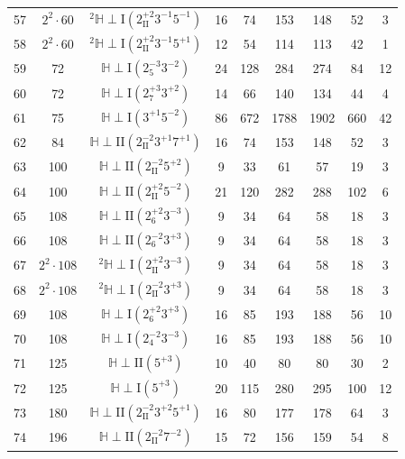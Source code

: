 \documentclass{amsart}
\theoremstyle{definition}
\theoremstyle{remark}
\begin{document}
\begin{center}
\begin{longtable}{c|c|c|c|c|c|c|c|c}
  57 &  $2^2 \cdot 60$ & ${}^{2}\!{\mathbb{H}} \perp \mathrm{I}(2_{\mathrm{II}}^{+2}3^{-1}5^{-1})$   & 16 & 74 & 153 & 148 & 52 & 3 \\
  58 &  $2^2 \cdot 60$ & ${}^{2}\!{\mathbb{H}} \perp \mathrm{I}(2_{\mathrm{II}}^{+2}3^{-1}5^{+1})$   & 12 & 54 & 114 & 113 & 42 & 1 \\
  59 &  72 & $\mathbb{H} \perp \mathrm{I}(2_{5}^{-3}3^{-2})$   & 24 & 128 & 284 & 274 & 84 & 12 \\
  60 &   72 & $\mathbb{H} \perp \mathrm{I}(2_{7}^{+3}3^{+2})$   & 14 & 66 & 140 & 134 & 44 & 4 \\
  61 &  75 & $\mathbb{H} \perp \mathrm{I}(3^{+1}5^{-2})$   & 86 & 672 & 1788 & 1902 & 660 & 42 \\
  62 &  84 & $\mathbb{H} \perp \mathrm{II}(2_{\mathrm{II}}^{-2}3^{+1}7^{+1})$   & 16 & 74 & 153 & 148 & 52 & 3 \\
  63 &  100 & $\mathbb{H} \perp \mathrm{II}(2_{\mathrm{II}}^{-2}5^{+2})$   & 9 & 33 & 61 & 57 & 19 & 3 \\
  64 &  100 & $\mathbb{H} \perp \mathrm{II}(2_{\mathrm{II}}^{+2}5^{-2})$   & 21 & 120 & 282 & 288 & 102 & 6 \\
  65 & 108 & $\mathbb{H} \perp \mathrm{II}(2_{6}^{+2}3^{-3})$   & 9 & 34 & 64 & 58 & 18 & 3 \\
  66 &108 & $\mathbb{H} \perp \mathrm{II}(2_{6}^{-2}3^{+3})$   & 9 & 34 & 64 & 58 & 18 & 3 \\
  67 & $2^2 \cdot 108$ & ${}^{2}\!{\mathbb{H}} \perp \mathrm{I}(2_{\mathrm{II}}^{+2}3^{-3})$   & 9 & 34 & 64 & 58 & 18 & 3 \\
  68 & $2^2 \cdot 108$ & ${}^{2}\!{\mathbb{H}} \perp \mathrm{I}(2_{\mathrm{II}}^{-2}3^{+3})$   & 9 & 34 & 64 & 58 & 18 & 3 \\
  69 &  108 & $\mathbb{H} \perp \mathrm{I}(2_{6}^{+2}3^{+3})$   & 16 & 85 & 193 & 188 & 56 & 10 \\
  70 &  108 & $\mathbb{H} \perp \mathrm{I}(2_{4}^{-2}3^{-3})$   & 16 & 85 & 193 & 188 & 56 & 10 \\
  71 & 125 & $\mathbb{H} \perp \mathrm{II}(5^{+3})$   & 10 & 40 & 80 & 80 & 30 & 2 \\
  72 & 125 & $\mathbb{H} \perp \mathrm{I}(5^{+3})$   & 20 & 115 & 280 & 295 & 100 & 12 \\
  73 & 180 & $\mathbb{H} \perp \mathrm{II}(2_{\mathrm{II}}^{-2}3^{+2}5^{+1})$   & 16 & 80 & 177 & 178 & 64 & 3 \\
  74 & 196 & $\mathbb{H} \perp \mathrm{II}(2_{\mathrm{II}}^{-2}7^{-2})$   & 15 & 72 & 156 & 159 & 54 & 8 \\

\end{longtable}
\end{center}
\end{document}

